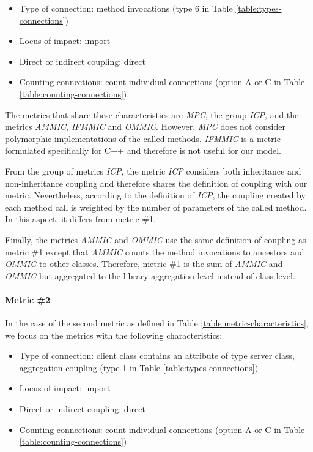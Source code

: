 \begin{itemize}
  \item Type of connection: method invocations (type 6 in Table \ref{table:types-connections})
  \item Locus of impact: import
  \item Direct or indirect coupling: direct
  \item Counting connections: count individual connections (option A or C in Table \ref{table:counting-connections}).
\end{itemize}

The metrics that share these characteristics are \textit{MPC}, the group \textit{ICP}, and the metrics \textit{AMMIC}, \textit{IFMMIC} and \textit{OMMIC}. However, \textit{MPC} does not consider polymorphic implementations of the called methods. \textit{IFMMIC} is a metric formulated specifically for C++ \cite{briand1997investigation} and therefore is not useful for our model.

From the group of metrics \textit{ICP}, the metric \textit{ICP}  considers both inheritance and non-inheritance coupling and therefore shares the definition of coupling with our metric. Nevertheless, according to the definition of \textit{ICP}, the coupling created by each method call is weighted by the number of parameters of the called method. In this aspect, it differs from metric \#1.

Finally, the metrics \textit{AMMIC} and \textit{OMMIC} use the same definition of coupling as metric \#1 except that \textit{AMMIC} counts the method invocations to ancestors and \textit{OMMIC} to other classes. Therefore, metric \#1 is the sum of \textit{AMMIC} and \textit{OMMIC} but aggregated to the library aggregation level instead of class level.

\paragraph{Metric \#2}
In the case of the second metric as defined in Table \ref{table:metric-characteristics}, we focus on the metrics with the following characteristics:

\begin{itemize}
  \item Type of connection: client class contains an attribute of type server class, aggregation coupling (type 1 in Table \ref{table:types-connections})
  \item Locus of impact: import
  \item Direct or indirect coupling: direct
  \item Counting connections: count individual connections (option A or C in Table \ref{table:counting-connections})
\end{itemize}

